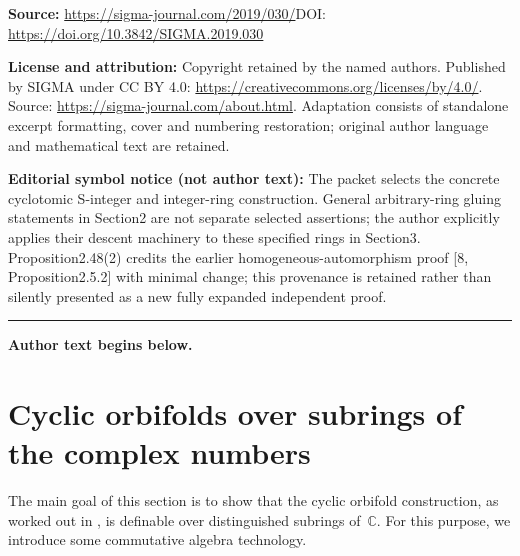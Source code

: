\documentclass[11pt]{article}
\newcommand{\bC}{\mathbb{C}}
\theoremstyle{definition}
\begin{document}
\noindent\textbf{Source:} \url{https://sigma-journal.com/2019/030/}\quad DOI: \url{https://doi.org/10.3842/SIGMA.2019.030}\par
\noindent\textbf{License and attribution:} Copyright retained by the named authors. Published by SIGMA under CC BY 4.0: \url{https://creativecommons.org/licenses/by/4.0/}. Source: \url{https://sigma-journal.com/about.html}. Adaptation consists of standalone excerpt formatting, cover and numbering restoration; original author language and mathematical text are retained.\par
\noindent\textbf{Editorial symbol notice (not author text):} The packet selects the concrete cyclotomic S-integer and integer-ring construction. General arbitrary-ring gluing statements in Section2 are not separate selected assertions; the author explicitly applies their descent machinery to these specified rings in Section3. Proposition2.48(2) credits the earlier homogeneous-automorphism proof [8, Proposition2.5.2] with minimal change; this provenance is retained rather than silently presented as a new fully expanded independent proof.\par
\medskip\hrule\medskip\noindent\textbf{Author text begins below.}\par
\setcounter{section}{1}
\setcounter{subsection}{0}
\setcounter{subsubsection}{0}
\setcounter{thm}{0}
\setcounter{equation}{0}
\section{Cyclic orbifolds over subrings of the complex numbers}

The main goal of this section is to show that the cyclic orbifold construction, as worked out in \cite{vEMS}, is definable over distinguished subrings of~$\bC$. For this purpose, we introduce some commutative algebra technology.
\end{document}
